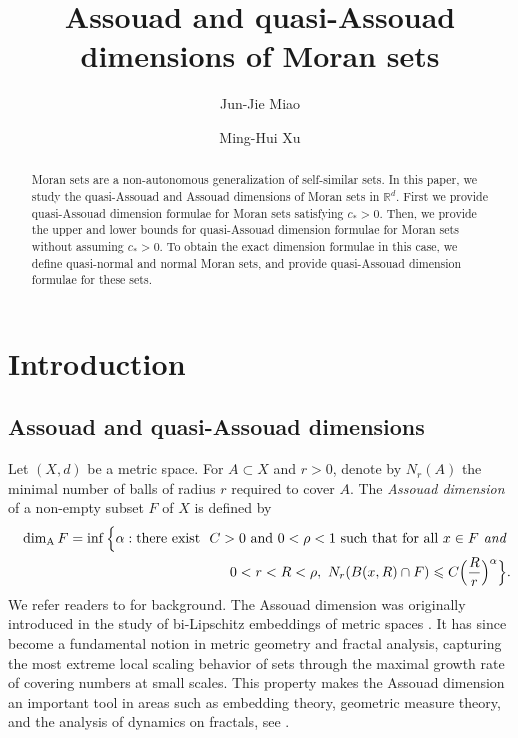 \documentclass[12pt]{amsart}
\title{Assouad   and quasi-Assouad dimensions of Moran sets}
\author{Jun-Jie Miao}
\author{Ming-Hui Xu}
\numberwithin{equation}{section}
\theoremstyle{plain}
\theoremstyle{remark}
\theoremstyle{definition}
\renewcommand{\le}{\leqslant}
\DeclareMathOperator{\dima}{dim_A}
\begin{document}
	\maketitle
	
	
	
	
	\begin{abstract}
		Moran sets are a non-autonomous generalization of self-similar sets.  In this paper, we study the quasi-Assouad and Assouad dimensions of Moran sets in $\mathbb{R}^{d}$.
		First we provide quasi-Assouad dimension formulae for Moran sets satisfying $c_*>0$. Then, we provide the upper and lower bounds for 
		quasi-Assouad dimension formulae for Moran sets without assuming  $c_*>0$. To obtain the exact dimension formulae in this case, we define quasi-normal
		and normal Moran sets, and provide  quasi-Assouad dimension formulae for these sets.
	\end{abstract}
	
	
	\section{Introduction}
	\subsection{Assouad and quasi-Assouad dimensions}
	Let $(X,d)$ be a metric space. For $A\subset X$ and $r>0$, denote by $N_r(A)$ the minimal number of balls of radius $r$ required to cover $A$. The \emph{Assouad dimension} of a non-empty subset $F$ of $X$ is defined by
	\begin{eqnarray*}
		\quad \dima F=\inf\Big\{\alpha:\text{there exist \ } C>0\text{\ and\ }0<\rho<1 \text{\ such that for all\ } x\in F \textit{ and }\\
		0<r<R<\rho,\vspace{0.5em}\
		N_r(B(x,R)\cap F)\le C\Big(\frac Rr\Big)^{\alpha}
		\Big\}.
	\end{eqnarray*}
We refer readers to \cite{falconer2013fractal,fraser2020assouad} for background.	The Assouad dimension was originally introduced in the study of bi-Lipschitz embeddings of metric spaces \cite{assouad1977espaces}. It has since become a fundamental notion in metric geometry and fractal analysis, capturing the most extreme local scaling behavior of sets through the maximal growth rate of covering numbers at small scales.
	This property makes the Assouad dimension an important tool in areas such as embedding theory, geometric measure theory, and the analysis of dynamics on fractals, see \cite{fraser2020assouad, heinonen2001lectures, %
		robinson2010dimensions}. 
\end{document}

